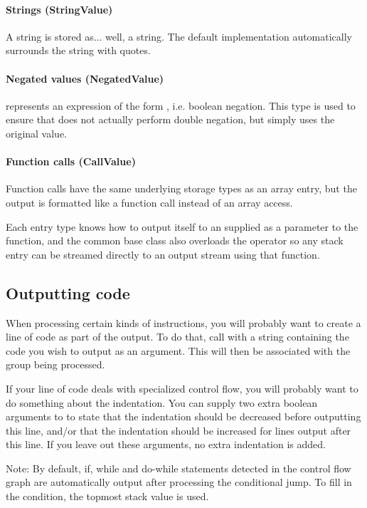 \paragraph{Strings (StringValue)}
A string is stored as... well, a string. The default implementation automatically surrounds the string with quotes.

\paragraph{Negated values (NegatedValue)}
 represents an expression of the form , i.e. boolean negation. This type is used to ensure that  does not actually perform double negation, but simply uses the original value.

\paragraph{Function calls (CallValue)}
Function calls have the same underlying storage types as an array entry, but the output is formatted like a function call instead of an array access.

Each entry type knows how to output itself to an  supplied as a parameter to the  function, and the common base class  also overloads the \code{<<} operator so any stack entry can be streamed directly to an output stream using that function.

\subsection{Outputting code}
When processing certain kinds of instructions, you will probably want to create a line of code as part of the output. To do that, call  with a string containing the code you wish to output as an argument. This will then be associated with the group being processed.

If your line of code deals with specialized control flow, you will probably want to do something about the indentation. You can supply two extra boolean arguments to  to state that the indentation should be decreased before outputting this line, and/or that the indentation should be increased for lines output after this line. If you leave out these arguments, no extra indentation is added.

Note: By default, if, while and do-while statements detected in the control flow graph are automatically output after processing the conditional jump. To fill in the condition, the topmost stack value is used.

